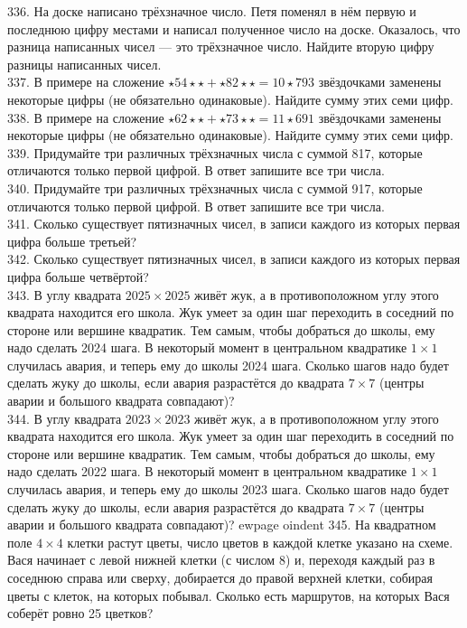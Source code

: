 336. На доске написано трёхзначное число. Петя поменял в нём первую и последнюю цифру местами и написал полученное число на доске. Оказалось, что разница написанных чисел --- это трёхзначное число. Найдите вторую цифру разницы написанных чисел.\\
337. В примере на сложение $\star54\star\star+\star82\star\star=10\star793$ звёздочками заменены некоторые цифры (не обязательно одинаковые). Найдите сумму этих семи цифр.\\
338. В примере на сложение $\star62\star\star+\star73\star\star=11\star691$ звёздочками заменены некоторые цифры (не обязательно одинаковые). Найдите сумму этих семи цифр.\\
339. Придумайте три различных трёхзначных числа с суммой 817, которые отличаются только первой цифрой. В ответ запишите все три числа.\\
340. Придумайте три различных трёхзначных числа с суммой 917, которые отличаются только первой цифрой. В ответ запишите все три числа.\\
341. Сколько существует пятизначных чисел, в записи каждого из которых первая цифра больше третьей?\\
342. Сколько существует пятизначных чисел, в записи каждого из которых первая цифра больше четвёртой?\\
343. В углу квадрата $2025\times2025$ живёт жук, а в противоположном углу этого квадрата находится его школа. Жук умеет за один шаг переходить в соседний по стороне или вершине квадратик. Тем самым, чтобы добраться до школы, ему надо сделать 2024 шага. В некоторый момент в центральном квадратике $1\times1$ случилась авария, и теперь ему до школы 2024 шага. Сколько шагов надо будет сделать жуку до школы, если авария разрастётся до квадрата $7\times7$ (центры аварии и большого квадрата совпадают)?\\
344. В углу квадрата $2023\times2023$ живёт жук, а в противоположном углу этого квадрата находится его школа. Жук умеет за один шаг переходить в соседний по стороне или вершине квадратик. Тем самым, чтобы добраться до школы, ему надо сделать 2022 шага. В некоторый момент в центральном квадратике $1\times1$ случилась авария, и теперь ему до школы 2023 шага. Сколько шагов надо будет сделать жуку до школы, если авария разрастётся до квадрата $7\times7$ (центры аварии и большого квадрата совпадают)?
ewpage
oindent
345. На квадратном поле $4\times4$ клетки растут цветы, число цветов в каждой клетке указано на схеме. Вася начинает с левой нижней клетки (с числом 8) и, переходя каждый раз в соседнюю справа или сверху, добирается до правой верхней клетки, собирая цветы с клеток, на которых побывал. Сколько есть маршрутов, на которых Вася соберёт ровно 25 цветков?\\
